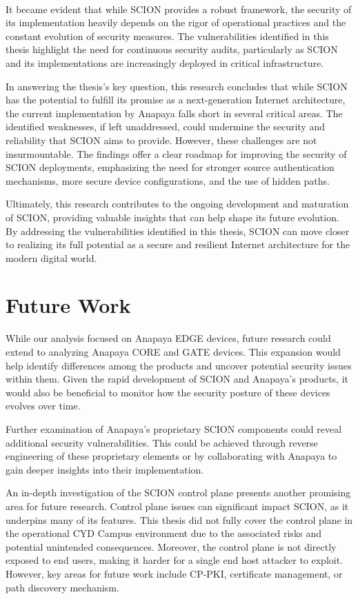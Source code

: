 \\
It became evident that while SCION provides a robust framework, the security of its implementation heavily depends on the rigor of operational practices and the constant evolution of security measures.
The vulnerabilities identified in this thesis highlight the need for continuous security audits, particularly as SCION and its implementations are increasingly deployed in critical infrastructure.

In answering the thesis's key question, this research concludes that while SCION has the potential to fulfill its promise as a next-generation Internet architecture, the current implementation by Anapaya falls short in several critical areas.
The identified weaknesses, if left unaddressed, could undermine the security and reliability that SCION aims to provide.
However, these challenges are not insurmountable.
The findings offer a clear roadmap for improving the security of SCION deployments, emphasizing the need for stronger source authentication mechanisms, more secure device configurations, and the use of hidden paths.

Ultimately, this research contributes to the ongoing development and maturation of SCION, providing valuable insights that can help shape its future evolution.
By addressing the vulnerabilities identified in this thesis, SCION can move closer to realizing its full potential as a secure and resilient Internet architecture for the modern digital world.


\section{Future Work}

While our analysis focused on Anapaya EDGE devices, future research could extend to analyzing Anapaya CORE and GATE devices.
This expansion would help identify differences among the products and uncover potential security issues within them.
Given the rapid development of SCION and Anapaya's products, it would also be beneficial to monitor how the security posture of these devices evolves over time.

Further examination of Anapaya's proprietary SCION components could reveal additional security vulnerabilities.
This could be achieved through reverse engineering of these proprietary elements or by collaborating with Anapaya to gain deeper insights into their implementation.

An in-depth investigation of the SCION control plane presents another promising area for future research.
Control plane issues can significant impact SCION, as it underpins many of its features.
This thesis did not fully cover the control plane in the operational CYD Campus environment due to the associated risks and potential unintended consequences.
Moreover, the control plane is not directly exposed to end users, making it harder for a single end host attacker to exploit.
However, key areas for future work include CP-PKI, certificate management, or path discovery mechanism.

